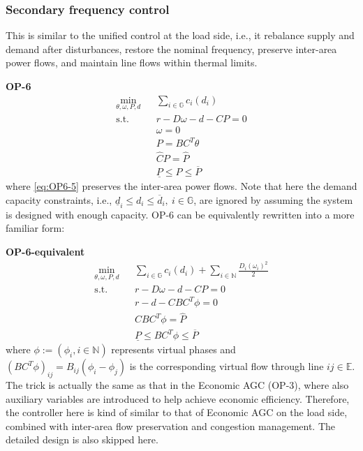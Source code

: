 \documentclass[journal,12pt,onecolumn,draftclsnofoot]{IEEEtran}
\begin{document}
\subsubsection{Secondary frequency control \cite{mallada2017optimal}}
This is similar to the unified control at the load side, i.e., it rebalance supply and demand after disturbances, restore the nominal frequency, preserve inter-area power flows, and maintain line flows within thermal limits.

\noindent
\textbf{OP-6}
\begin{subequations}
	\begin{eqnarray}
	\min_{\theta, \omega, P, d} && \sum_{i\in\mathbb{G}} c_i(d_i)  \\
	\mathrm{s.t.} && r-D\omega-d-C P=0 \\
	&& \omega=0 \\
	&& P=BC^T\theta\\
	\label{eq:OP6-5}
	&&  \hat C P= \hat P   \\
	&& \underline{ P} \le P \le \overline{ P}
	\end{eqnarray}\label{eq:OP6}%
\end{subequations}
where \eqref{eq:OP6-5} preserves the inter-area power flows. Note that here the demand capacity constraints, i.e., $ \underline{d}_i \le d_i \le \overline{d}_i,~i \in \mathbb{G}$, are ignored by assuming the system is designed with enough capacity.
OP-6 can be equivalently rewritten into a more familiar form:

\noindent
\textbf{OP-6-equivalent}
\begin{subequations}
	\begin{eqnarray}
	\min_{\theta, \omega, P, d} && \sum_{i\in\mathbb{G}} c_i(d_i) +\sum_{i\in\mathbb{N}} \frac{D_i (\omega_i)^2}{2} \\
	\mathrm{s.t.} && r-D\omega-d-C P=0 \\
	 && r-d-C B C^T \phi =0 \\
	&& \hat C BC^T\phi =  \hat P \\
	&& \underline{ P} \le BC^T\phi  \le \overline{ P}
	\end{eqnarray}\label{eq:OP6t}%
\end{subequations}
where $\phi:=(\phi_i, i\in\mathbb{N})$ represents virtual phases and $(BC^T\phi)_{ij}=B_{ij}(\phi_i-\phi_j) $ is the corresponding virtual flow through line $ij\in\mathbb{E}$. The trick is actually the same as that in the Economic AGC (OP-3), where also auxiliary variables are introduced to help achieve economic efficiency. Therefore, the controller here is kind of similar to that of Economic AGC on the load side, combined with inter-area flow preservation and congestion management. The detailed design is also skipped here.
\end{document}
